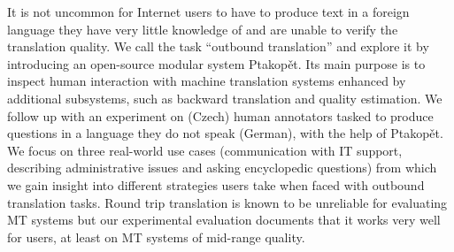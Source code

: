 \documentclass[12pt]{report}
\begin{document}

It is not uncommon for Internet users to have to produce text in a foreign language they have very little knowledge of and are unable to verify the translation quality. We call the task ``outbound translation'' and explore it by introducing an open-source modular system Ptakopět. Its main purpose is to inspect human interaction with machine translation systems enhanced by additional subsystems, such as backward translation and quality estimation. We follow up with an experiment on (Czech) human annotators tasked to produce questions in a language they do not speak (German), with the help of Ptakopět. We focus on three real-world use cases (communication with IT support, describing administrative issues and asking encyclopedic questions) from which we gain insight into different strategies users take when faced with outbound translation tasks. Round trip translation is known to be unreliable for evaluating MT systems but our experimental evaluation documents that it works very well for users, at least on MT systems of mid-range quality.
\end{document}
